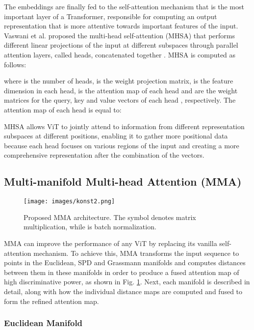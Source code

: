 \documentclass[10pt,twocolumn,letterpaper]{article}
\begin{document}
The embeddings are finally fed to the self-attention mechanism that is the most important layer of a Transformer, responsible for computing an output representation that is more attentive towards important features of the input. Vaswani et al. proposed the multi-head self-attention (MHSA) that performs different linear projections of the input at different subspaces through parallel attention layers, called heads, concatenated together \cite{Author29}. MHSA is computed as follows:



where  is the number of heads,  is the weight projection matrix,  is the feature dimension in each head,  is the attention map of each head and  are the weight matrices for the query, key and value vectors of each head , respectively. The attention map of each head  is equal to:



MHSA allows ViT to jointly attend to information from different representation subspaces at different positions, enabling it to gather more positional data because each head focuses on various regions of the input and creating a more comprehensive representation after the combination of the vectors.

\subsection{Multi-manifold Multi-head Attention (MMA)}

\begin{figure}[t]
  \centering
  \texttt{[image: images/konst2.png]}
  \caption{Proposed MMA architecture. The symbol  denotes matrix multiplication, while  is batch normalization.}
  \label{fig:mma}
\end{figure}

MMA can improve the performance of any ViT by replacing its vanilla self-attention mechanism. To achieve this, MMA transforms the input sequence to points in the Euclidean, SPD and Grassmann manifolds and computes distances between them in these manifolds in order to produce a fused attention map of high discriminative power, as shown in Fig. \ref{fig:mma}. Next, each manifold is described in detail, along with how the individual distance maps are computed and fused to form the refined attention map.

\subsubsection{Euclidean Manifold}
\end{document}
